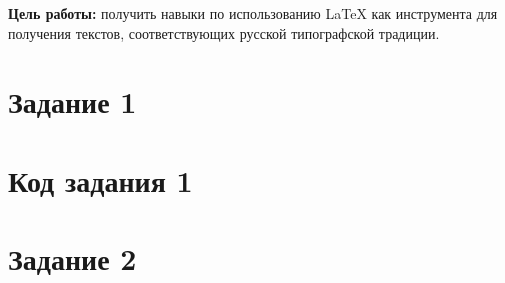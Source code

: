 \documentclass[a4paper, 14pt]{extarticle}
\begin{document}
    \graphicspath{{images/}{images2/}} %

    \author{М.А.Гейне}
    \bmstutitlelab

    \textbf{Цель работы:} 
    получить навыки по использованию LaTeX как инструмента 
    для получения текстов, соответствующих русской типографской традиции.

    \section{Задание 1}
    

    \section{Код задания 1}

    \section{Задание 2}
    
\end{document}
